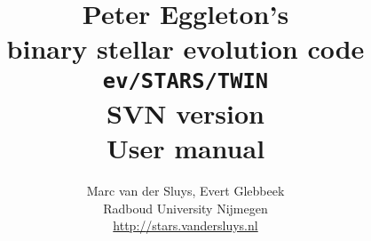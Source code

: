 

\usepackage[english]{babel}


\newcommand{\remark}[1]{{\color{red}\textbf{#1}}}
\newcommand{\eg}{\emph{e.g.}}
\newcommand{\ie}{\emph{i.e.}}

\def\Msun{M_\odot}
\def\Rsun{R_\odot}
\def\Lsun{L_\odot}


\title{
  Peter Eggleton's \\ 
  binary stellar evolution code \\ 
  \texttt{ev/STARS/TWIN} \\ 
  {\large SVN version} \\ 
  User manual}

\author{
  Marc van der Sluys,  Evert Glebbeek \\
  Radboud University Nijmegen\\
  {\small \href{http://stars.vandersluys.nl}{http:/$\!$/stars.vandersluys.nl}}
}





\maketitle
\pagebreak
\tableofcontents

\pagebreak


\pagebreak


\pagebreak



\pagebreak

\pagebreak



\pagebreak

\pagebreak

\pagebreak


\pagebreak

\pagebreak



\pagebreak

\pagebreak

\pagebreak


\pagebreak


\pagebreak

\pagebreak





